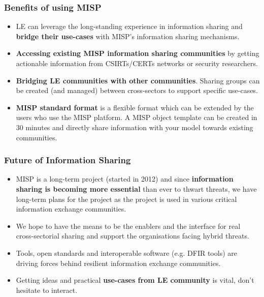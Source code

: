 \begin{frame}
\frametitle{Benefits of using MISP}
\begin{itemize}
        \item  LE can leverage the long-standing experience in information sharing and {\bf bridge their use-cases} with MISP's information sharing mechanisms.
        \item {\bf Accessing existing MISP information sharing communities} by getting actionable information from CSIRTs/CERTs networks or security researchers.
        \item {\bf Bridging LE communities with other communities}. Sharing groups can be created (and managed) between cross-sectors to support specific use-cases.
        \item {\bf MISP standard format} is a flexible format which can be extended by the users who use the MISP platform. A MISP object template can be created in 30 minutes and directly share information with your model towards existing communities.
\end{itemize}
\end{frame}

\begin{frame}
        \frametitle{Future of Information Sharing}
        \begin{itemize}
        \item MISP is a long-term project (started in 2012) and since {\bf information sharing is becoming more essential} than ever to thwart threats, we have long-term plans for the project as the project is used in various critical information exchange communities.
        \item We hope to have the means to be the enablers and the interface for real cross-sectorial sharing and support the organisations facing hybrid threats.
        \item Tools, open standards and interoperable software (e.g. DFIR tools) are driving forces behind resilient information exchange communities.
        \item Getting ideas and practical {\bf use-cases from LE community} is vital, don't hesitate to interact.
        \end{itemize}
\end{frame}


